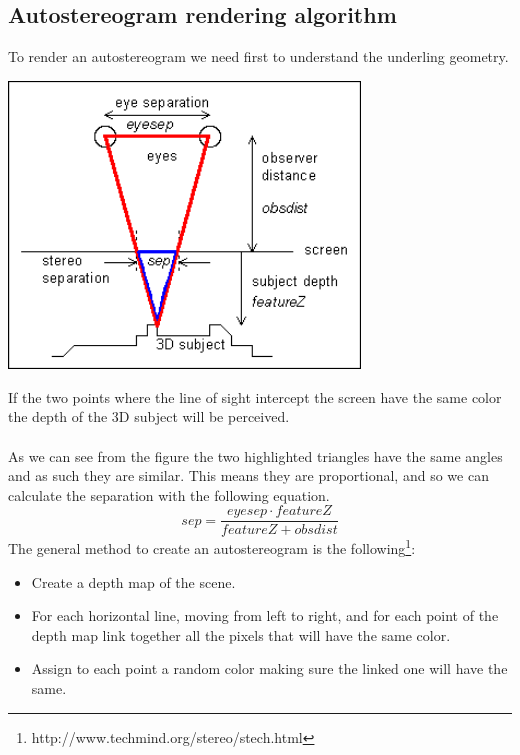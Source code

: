 \documentclass[12pt, a4paper]{article}
\begin{document}
\subsection{Autostereogram rendering algorithm}
To render an autostereogram we need first to understand the underling geometry.\\
\begin{center}
    \centering
    \includegraphics[width=0.7\textwidth]{img/geometry.png}
\end{center}
If the two points where the line of sight intercept the screen have the same color the depth of the 3D
subject will be perceived.\\\\
As we can see from the figure the two highlighted triangles have the same angles and as such they are similar.
This means they are proportional, and so we can calculate the separation with the following equation.
\[
sep = \frac{eyesep \cdot featureZ}{featureZ + obsdist}
\]
The general method to create an autostereogram is the following\footnote{http://www.techmind.org/stereo/stech.html}:
\begin{itemize}
    \item Create a depth map of the scene.
    \item For each horizontal line, moving from left to right, and for each point of the depth map link together all the pixels that will have the same color.
    \item Assign to each point a random color making sure the linked one will have the same.
\end{itemize}
\end{document}
